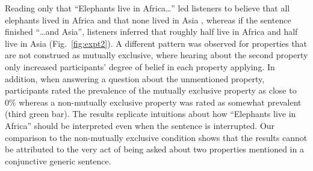 \documentclass[10pt,letterpaper]{article}
\newcommand{\mh}[1]{{\textcolor{Blue}{[mh: #1]}}}
\begin{document}
 Reading only that ``Elephants live in Africa\ldots'' led listeners to believe that all elephants lived in Africa and that none lived in Asia , whereas if the sentence finished ``\ldots and Asia'', listeners inferred that roughly half live in Africa and half live in Asia (Fig.~\ref{fig:expt2}). 
A different pattern was observed for properties that are not construed as mutually exclusive, where hearing about the second property only increased participants' degree of belief in each property applying.
In addition, when answering a question about the unmentioned property, participants rated the prevalence of the mutually exclusive property as close to 0\% whereas a non-mutually exclusive property was rated as somewhat prevalent (third green bar).
The results replicate intuitions about how ``Elephants live in Africa'' should be interpreted even when the sentence is interrupted. 
Our comparison to the non-mutually exclusive condition shows that the results cannot be attributed to the very act of being asked about two properties mentioned in a conjunctive generic sentence.


\end{document}
